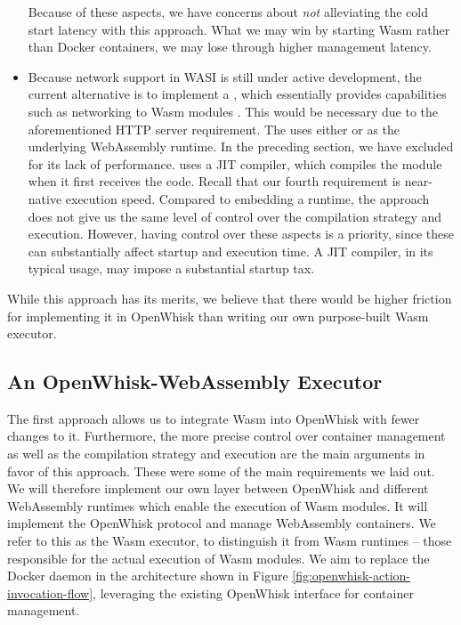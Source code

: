 \begin{itemize}
    Because of these aspects, we have concerns about \emph{not} alleviating the cold start latency with this approach. What we may win by starting Wasm rather than Docker containers, we may lose through higher management latency.
    \item Because network support in WASI is still under active development, the current alternative is to implement a , which essentially provides capabilities such as networking to Wasm modules \cite{WC2021}. This would be necessary due to the aforementioned HTTP server requirement. The  uses either  or  as the underlying WebAssembly runtime. In the preceding section, we have excluded  for its lack of performance.  uses a JIT compiler, which compiles the module when it first receives the code. Recall that our fourth requirement is near-native execution speed. Compared to embedding a runtime, the  approach does not give us the same level of control over the compilation strategy and execution. However, having control over these aspects is a priority, since these can substantially affect startup and execution time. A JIT compiler, in its typical usage, may impose a substantial startup tax.
\end{itemize}

While this approach has its merits, we believe that there would be higher friction for implementing it in OpenWhisk than writing our own purpose-built Wasm executor.

\subsection{An OpenWhisk-WebAssembly Executor}


The first approach allows us to integrate Wasm into OpenWhisk with fewer changes to it. Furthermore, the more precise control over container management as well as the compilation strategy and execution are the main arguments in favor of this approach. These were some of the main requirements we laid out. We will therefore implement our own layer between OpenWhisk and different WebAssembly runtimes which enable the execution of Wasm modules. It will implement the OpenWhisk protocol and manage WebAssembly containers. We refer to this as the Wasm executor, to distinguish it from Wasm runtimes -- those responsible for the actual execution of Wasm modules. We aim to replace the Docker daemon in the architecture shown in Figure \ref{fig:openwhisk-action-invocation-flow}, leveraging the existing OpenWhisk interface for container management.

